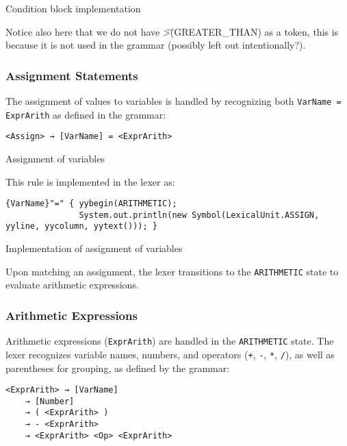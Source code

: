     \begin{table}[h]
		\centering
		\caption{Condition block implementation}
	\end{table}
 
	Notice also here that we do not have \">\" (GREATER\_THAN) as a token, this is because it is not used in the grammar (possibly left out intentionally?).\\

	\subsubsection{Assignment Statements}
	The assignment of values to variables is handled by recognizing both \texttt{VarName = ExprArith} as defined in the grammar:

	\begin{verbatim}
<Assign> → [VarName] = <ExprArith>
	\end{verbatim}

    \begin{table}[h]
		\centering
		\caption{Assignment of variables}
	\end{table}

	This rule is implemented in the lexer as:

	\begin{verbatim}
{VarName}"=" { yybegin(ARITHMETIC);
               System.out.println(new Symbol(LexicalUnit.ASSIGN, yyline, yycolumn, yytext())); }
	\end{verbatim}

    \begin{table}[h]
		\centering
		\caption{Implementation of assignment of variables}
	\end{table}

	Upon matching an assignment, the lexer transitions to the \texttt{ARITHMETIC} state to evaluate arithmetic expressions.

	\subsubsection{Arithmetic Expressions}
	Arithmetic expressions (\texttt{ExprArith}) are handled in the \texttt{ARITHMETIC} state. The lexer recognizes variable names, numbers, and operators (\texttt{+}, \texttt{-}, \texttt{*}, \texttt{/}), as well as parentheses for grouping, as defined by the grammar:

	\begin{verbatim}
<ExprArith> → [VarName]
    → [Number]
    → ( <ExprArith> )
    → - <ExprArith>
    → <ExprArith> <Op> <ExprArith>
	\end{verbatim}


